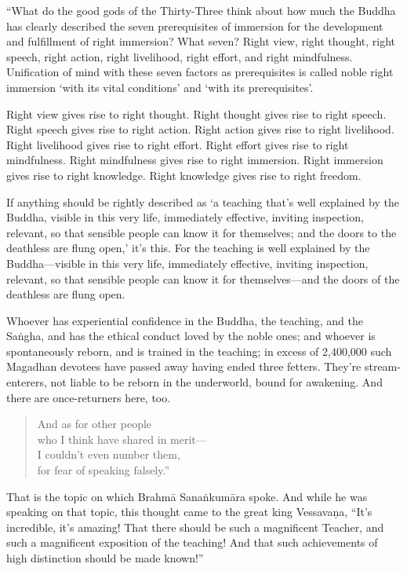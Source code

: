 \documentclass[12pt,openany]{book}%
\begin{document}
“What do the good gods of the Thirty-Three think about how much the Buddha has clearly described the seven prerequisites of immersion for the development and fulfillment of right immersion? What seven? Right view, right thought, right speech, right action, right livelihood, right effort, and right mindfulness. Unification of mind with these seven factors as prerequisites is called noble right immersion ‘with its vital conditions’ and ‘with its prerequisites’. 

Right view gives rise to right thought. Right thought gives rise to right speech. Right speech gives rise to right action. Right action gives rise to right livelihood. Right livelihood gives rise to right effort. Right effort gives rise to right mindfulness. Right mindfulness gives rise to right immersion. Right immersion gives rise to right knowledge. Right knowledge gives rise to right freedom. 

If anything should be rightly described as ‘a teaching that’s well explained by the Buddha, visible in this very life, immediately effective, inviting inspection, relevant, so that sensible people can know it for themselves; and the doors to the deathless are flung open,’ it’s this. For the teaching is well explained by the Buddha—visible in this very life, immediately effective, inviting inspection, relevant, so that sensible people can know it for themselves—and the doors of the deathless are flung open. 

Whoever has experiential confidence in the Buddha, the teaching, and the \textsanskrit{Saṅgha}, and has the ethical conduct loved by the noble ones; and whoever is spontaneously reborn, and is trained in the teaching; in excess of 2,400,000 such Magadhan devotees have passed away having ended three fetters. They’re stream-enterers, not liable to be reborn in the underworld, bound for awakening. And there are once-returners here, too. 

\begin{verse}%
And as for other people \\
who I think have shared in merit—\\
I couldn’t even number them, \\
for fear of speaking falsely.” 

%
\end{verse}

That is the topic on which \textsanskrit{Brahmā} \textsanskrit{Sanaṅkumāra} spoke. And while he was speaking on that topic, this thought came to the great king \textsanskrit{Vessavaṇa}, “It’s incredible, it’s amazing! That there should be such a magnificent Teacher, and such a magnificent exposition of the teaching! And that such achievements of high distinction should be made known!” 
\end{document}
